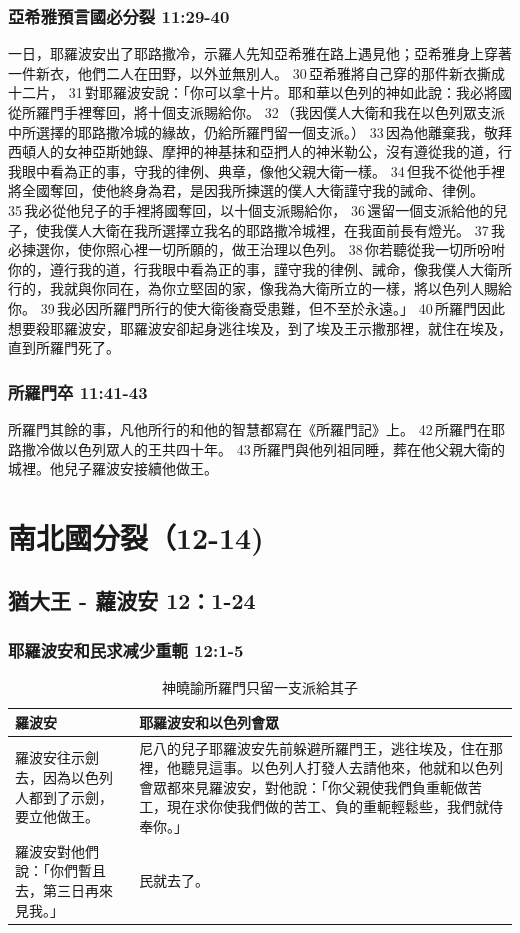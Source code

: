 \subsubsection{亞希雅預言國必分裂 11:29-40}
一日，耶羅波安出了耶路撒冷，示羅人先知亞希雅在路上遇見他；亞希雅身上穿著一件新衣，他們二人在田野，以外並無別人。 30 亞希雅將自己穿的那件新衣撕成十二片， 31 對耶羅波安說：「你可以拿十片。耶和華以色列的神如此說：我必將國從所羅門手裡奪回，將十個支派賜給你。 32 （我因僕人大衛和我在以色列眾支派中所選擇的耶路撒冷城的緣故，仍給所羅門留一個支派。） 33 因為他離棄我，敬拜西頓人的女神亞斯她錄、摩押的神基抹和亞捫人的神米勒公，沒有遵從我的道，行我眼中看為正的事，守我的律例、典章，像他父親大衛一樣。 34 但我不從他手裡將全國奪回，使他終身為君，是因我所揀選的僕人大衛謹守我的誡命、律例。 35 我必從他兒子的手裡將國奪回，以十個支派賜給你， 36 還留一個支派給他的兒子，使我僕人大衛在我所選擇立我名的耶路撒冷城裡，在我面前長有燈光。 37 我必揀選你，使你照心裡一切所願的，做王治理以色列。 38 你若聽從我一切所吩咐你的，遵行我的道，行我眼中看為正的事，謹守我的律例、誡命，像我僕人大衛所行的，我就與你同在，為你立堅固的家，像我為大衛所立的一樣，將以色列人賜給你。 39 我必因所羅門所行的使大衛後裔受患難，但不至於永遠。」 40 所羅門因此想要殺耶羅波安，耶羅波安卻起身逃往埃及，到了埃及王示撒那裡，就住在埃及，直到所羅門死了。

\subsubsection{所羅門卒 11:41-43}
所羅門其餘的事，凡他所行的和他的智慧都寫在《所羅門記》上。 42 所羅門在耶路撒冷做以色列眾人的王共四十年。 43 所羅門與他列祖同睡，葬在他父親大衛的城裡。他兒子羅波安接續他做王。


\section{南北國分裂（12-14)}
\subsection{猶大王 - 蘿波安 12：1-24 }



\subsubsection{耶羅波安和民求减少重軛 12:1-5}
\begin{table}[H]
\centering 
\begin{tabular}{p{7.75cm}|p{9.25cm}}\hline\hline
羅波安&耶羅波安和以色列會眾\\\hline
羅波安往示劍去，因為以色列人都到了示劍，要立他做王。&尼八的兒子耶羅波安先前躲避所羅門王，逃往埃及，住在那裡，他聽見這事。以色列人打發人去請他來，他就和以色列會眾都來見羅波安，對他說：「你父親使我們負重軛做苦工，現在求你使我們做的苦工、負的重軛輕鬆些，我們就侍奉你。」\\\hline
羅波安對他們說：「你們暫且去，第三日再來見我。」&民就去了。\\\hline
\end{tabular}
\caption{神曉諭所羅門只留一支派給其子}
\end{table}


